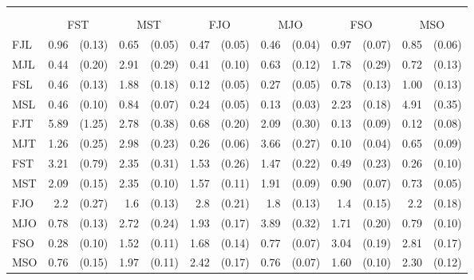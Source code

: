 \begin{tabular}{lrrrrrrrrrrrr}
\phantom{\textbf{Sender}} &\\
\\
    & \multicolumn{2}{c}{\textnormal{FST}}
    & \multicolumn{2}{c}{\textnormal{MST}}
    & \multicolumn{2}{c}{\textnormal{FJO}}
    & \multicolumn{2}{c}{\textnormal{MJO}}
    & \multicolumn{2}{c}{\textnormal{FSO}}
    & \multicolumn{2}{c}{\textnormal{MSO}} \\
    \cmidrule(lr){2-3}
    \cmidrule(lr){4-5}
    \cmidrule(lr){6-7}
    \cmidrule(lr){8-9}
    \cmidrule(lr){10-11}
    \cmidrule(lr){12-13}
    \textnormal{FJL} & 0.96 & (0.13) & 0.65 & (0.05) & 0.47 & (0.05) & 0.46 & (0.04) & 0.97 & (0.07) & 0.85 & (0.06) \\
    \textnormal{MJL} & 0.44 & (0.20) & 2.91 & (0.29) & 0.41 & (0.10) & 0.63 & (0.12) & 1.78 & (0.29) & 0.72 & (0.13) \\
    \textnormal{FSL} & 0.46 & (0.13) & 1.88 & (0.18) & 0.12 & (0.05) & 0.27 & (0.05) & 0.78 & (0.13) & 1.00 & (0.13) \\
    \textnormal{MSL} & 0.46 & (0.10) & 0.84 & (0.07) & 0.24 & (0.05) & 0.13 & (0.03) & 2.23 & (0.18) & 4.91 & (0.35) \\
    \textnormal{FJT} & 5.89 & (1.25) & 2.78 & (0.38) & 0.68 & (0.20) & 2.09 & (0.30) & 0.13 & (0.09) & 0.12 & (0.08) \\
    \textnormal{MJT} & 1.26 & (0.25) & 2.98 & (0.23) & 0.26 & (0.06) & 3.66 & (0.27) & 0.10 & (0.04) & 0.65 & (0.09) \\
    \textnormal{FST} & 3.21 & (0.79) & 2.35 & (0.31) & 1.53 & (0.26) & 1.47 & (0.22) & 0.49 & (0.23) & 0.26 & (0.10) \\
    \textnormal{MST} & 2.09 & (0.15) & 2.35 & (0.10) & 1.57 & (0.11) & 1.91 & (0.09) & 0.90 & (0.07) & 0.73 & (0.05) \\
    \textnormal{FJO} & 2.2 & (0.27) & 1.6 & (0.13) & 2.8 & (0.21) & 1.8 & (0.13) & 1.4 & (0.15) & 2.2 & (0.18) \\
    \textnormal{MJO} & 0.78 & (0.13) & 2.72 & (0.24) & 1.93 & (0.17) & 3.89 & (0.32) & 1.71 & (0.20) & 0.79 & (0.10) \\
    \textnormal{FSO} & 0.28 & (0.10) & 1.52 & (0.11) & 1.68 & (0.14) & 0.77 & (0.07) & 3.04 & (0.19) & 2.81 & (0.17) \\
    \textnormal{MSO} & 0.76 & (0.15) & 1.97 & (0.11) & 2.42 & (0.17) & 0.76 & (0.07) & 1.60 & (0.10) & 2.30 & (0.12) \\
\bottomrule
\end{tabular}